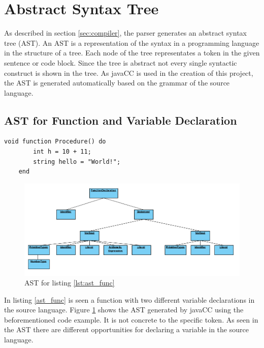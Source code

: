 \section{Abstract Syntax Tree}
As described in section \ref{sec:compiler}, the parser generates an abstract syntax tree (AST). An AST is a representation of the syntax in a programming language in the structure of a tree. Each node of the tree representates a token in the given sentence or code block. Since the tree is abstract not every single syntactic construct is shown in the tree. As javaCC is used in the creation of this project, the AST is generated automatically based on the grammar of the source language.

\subsection{AST for Function and Variable Declaration}
\begin{lstlisting}[caption=Function with variable declaration, label=lst:ast_func]
	void function Procedure() do
		int h = 10 + 11;
		string hello = "World!";
	end
\end{lstlisting}
\begin{figure}[H]
	\centering
		\includegraphics[width=\textwidth]{billeder/function_AST.png}
		\caption{AST for listing \ref{lst:ast_func}}
		\label{fig:ast_func}
\end{figure}
In listing \ref{ast_func} is seen a function with two different variable declarations in the source language. Figure \ref{fig:ast_func} shows the AST generated by javaCC using the beforementioned code example. It is not concrete to the specific token. As seen in the AST there are different opportunities for declaring a variable in the source language.

